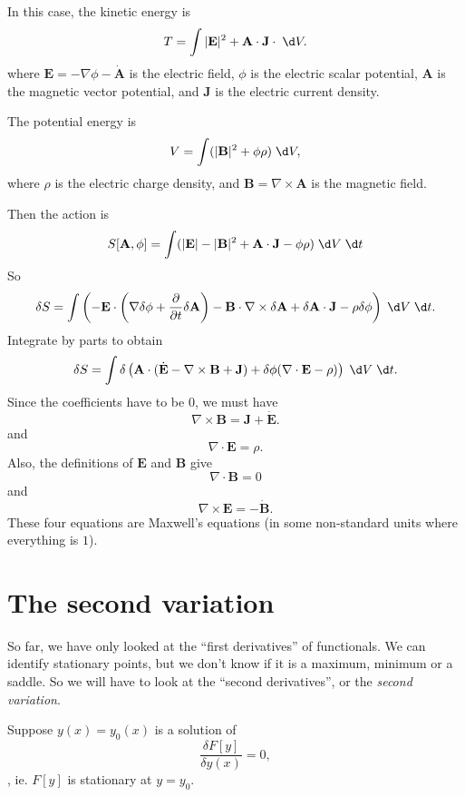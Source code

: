 \documentclass[a4paper]{article}
\begin{document}
\begin{eg}
  In this case, the kinetic energy is
  \[
    T = \int |\mathbf{E}|^2 + \mathbf{A}\cdot \mathbf{J}\cdot \;\d V.
  \]
  where $\mathbf{E} = -\nabla \phi - \dot{\mathbf{A}}$ is the electric field, $\phi$ is the electric scalar potential, $\mathbf{A}$ is the magnetic vector potential, and $\mathbf{J}$ is the electric current density.

  The potential energy is
  \[
    V = \int (|\mathbf{B}|^2 + \phi \rho)\;\d V,
  \]
  where $\rho$ is the electric charge density, and $\mathbf{B} = \nabla\times \mathbf{A}$ is the magnetic field.

  Then the action is
  \[
    S[\mathbf{A}, \phi] = \int (|\mathbf{E}| - |\mathbf{B}|^2 + \mathbf{A}\cdot \mathbf{J} - \phi \rho)\;\d V\;\d t
  \]
  So
  \[
    \delta S = \int \left(-\mathbf{E}\cdot \left(\nabla \delta\phi + \frac{\partial}{\partial t} \delta \mathbf{A}\right) - \mathbf{B}\cdot \nabla \times \delta \mathbf{A} + \delta \mathbf{A}\cdot \mathbf{J} - \rho\delta\phi\right)\;\d V\;\d t.
  \]
  Integrate by parts to obtain
  \[
    \delta S = \int\delta\left( \mathbf{A}\cdot (\dot{\mathbf{E}} - \nabla\times \mathbf{B} + \mathbf{J}) + \delta \phi(\nabla\cdot \mathbf{E} - \rho)\right)\;\d V\;\d t.
  \]
  Since the coefficients have to be $0$, we must have
  \[
    \nabla \times \mathbf{B} = \mathbf{J} + \dot{\mathbf{E}}.
  \]
  and
  \[
    \nabla \cdot \mathbf{E} = \rho.
  \]
  Also, the definitions of $\mathbf{E}$ and $\mathbf{B}$ give
  \[
    \nabla\cdot \mathbf{B} = 0
  \]
  and 
  \[
    \nabla \times \mathbf{E} = - \dot{\mathbf{B}}.
  \]
  These four equations are Maxwell's equations (in some non-standard units where everything is $1$).
\end{eg}
\section{The second variation}
So far, we have only looked at the ``first derivatives'' of functionals. We can identify stationary points, but we don't know if it is a maximum, minimum or a saddle. So we will have to look at the ``second derivatives'', or the \emph{second variation}.

Suppose $y(x) = y_0(x)$ is a solution of 
\[
  \frac{\delta F[y]}{\delta y(x)} = 0,
\]
, ie. $F[y]$ is stationary at $y = y_0$.
\end{document}
